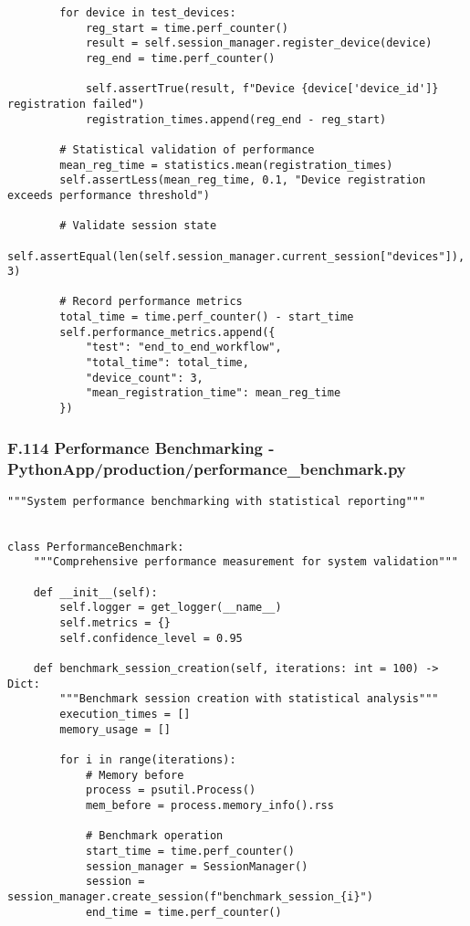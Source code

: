 \documentclass[12pt,a4paper]{report}
\begin{document}
{{\begin{verbatim}
        for device in test_devices:
            reg_start = time.perf_counter()
            result = self.session_manager.register_device(device)
            reg_end = time.perf_counter()

            self.assertTrue(result, f"Device {device['device_id']} registration failed")
            registration_times.append(reg_end - reg_start)

        # Statistical validation of performance
        mean_reg_time = statistics.mean(registration_times)
        self.assertLess(mean_reg_time, 0.1, "Device registration exceeds performance threshold")

        # Validate session state
        self.assertEqual(len(self.session_manager.current_session["devices"]), 3)

        # Record performance metrics
        total_time = time.perf_counter() - start_time
        self.performance_metrics.append({
            "test": "end_to_end_workflow",
            "total_time": total_time,
            "device_count": 3,
            "mean_registration_time": mean_reg_time
        })
\end{verbatim}

\subsubsection{F.114 Performance Benchmarking - PythonApp/production/performance_benchmark.py}

\begin{verbatim}
"""System performance benchmarking with statistical reporting"""


class PerformanceBenchmark:
    """Comprehensive performance measurement for system validation"""

    def __init__(self):
        self.logger = get_logger(__name__)
        self.metrics = {}
        self.confidence_level = 0.95

    def benchmark_session_creation(self, iterations: int = 100) -> Dict:
        """Benchmark session creation with statistical analysis"""
        execution_times = []
        memory_usage = []

        for i in range(iterations):
            # Memory before
            process = psutil.Process()
            mem_before = process.memory_info().rss

            # Benchmark operation
            start_time = time.perf_counter()
            session_manager = SessionManager()
            session = session_manager.create_session(f"benchmark_session_{i}")
            end_time = time.perf_counter()


\end{verbatim}}}
\end{document}
